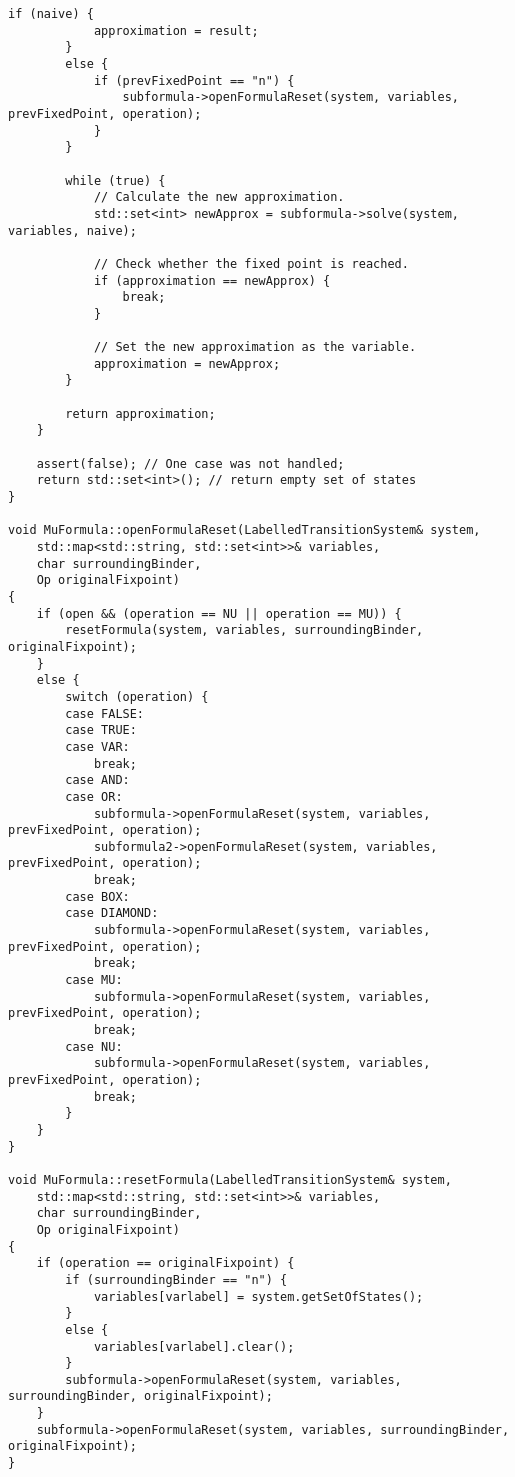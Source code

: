 \documentclass[10pt,a4paper]{article}
\begin{document}
\begin{lstlisting}[caption=MuCalculus.cpp]
        if (naive) {
            approximation = result;
        }
        else {
            if (prevFixedPoint == "n") {
                subformula->openFormulaReset(system, variables, prevFixedPoint, operation);
            }
        }

        while (true) {
            // Calculate the new approximation.
            std::set<int> newApprox = subformula->solve(system, variables, naive);

            // Check whether the fixed point is reached.
            if (approximation == newApprox) {
                break;
            }

            // Set the new approximation as the variable.
            approximation = newApprox;
        }

        return approximation;
    }

    assert(false); // One case was not handled;
    return std::set<int>(); // return empty set of states
}

void MuFormula::openFormulaReset(LabelledTransitionSystem& system, 
	std::map<std::string, std::set<int>>& variables, 
	char surroundingBinder, 
	Op originalFixpoint) 
{
    if (open && (operation == NU || operation == MU)) {
        resetFormula(system, variables, surroundingBinder, originalFixpoint);
    }
    else {
        switch (operation) {
        case FALSE:
        case TRUE:
        case VAR:
            break;
        case AND:
        case OR:
            subformula->openFormulaReset(system, variables, prevFixedPoint, operation);
            subformula2->openFormulaReset(system, variables, prevFixedPoint, operation);
            break;
        case BOX:
        case DIAMOND:
            subformula->openFormulaReset(system, variables, prevFixedPoint, operation);
            break;
        case MU:
            subformula->openFormulaReset(system, variables, prevFixedPoint, operation);
            break;
        case NU:
            subformula->openFormulaReset(system, variables, prevFixedPoint, operation);
            break;
        }
    }
}

void MuFormula::resetFormula(LabelledTransitionSystem& system, 
	std::map<std::string, std::set<int>>& variables, 
	char surroundingBinder, 
	Op originalFixpoint) 
{
    if (operation == originalFixpoint) {
        if (surroundingBinder == "n") {
            variables[varlabel] = system.getSetOfStates();
        }
        else {
            variables[varlabel].clear();
        }
        subformula->openFormulaReset(system, variables, surroundingBinder, originalFixpoint);
    }
    subformula->openFormulaReset(system, variables, surroundingBinder, originalFixpoint);
}


\end{lstlisting}
\end{document}
